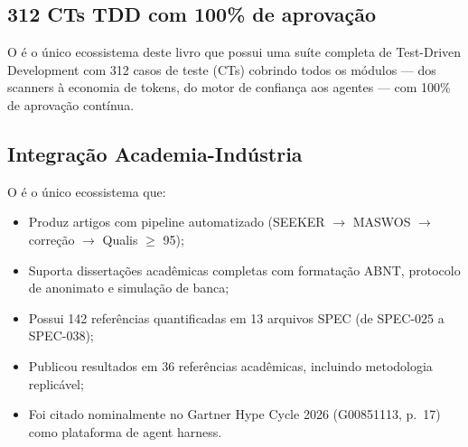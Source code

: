 \subsection{312 CTs TDD com 100\% de aprovação}

O \opencodeeco{} é o único ecossistema deste livro que possui uma suíte
completa de Test-Driven Development com 312 casos de teste (CTs)
cobrindo todos os módulos --- dos scanners à economia de tokens, do
motor de confiança aos agentes --- com 100\% de aprovação contínua.

\begin{table}[htb]
\centering
    \small
\caption{Cobertura de testes: OpenCode vs. alternativas}
\label{tab:testes}
\end{table}

\subsection{Integração Academia-Indústria}

O \opencodeeco{} é o único ecossistema que:
\begin{itemize}
    \item Produz artigos \qualisA{} com pipeline automatizado
          (SEEKER $\rightarrow$ MASWOS $\rightarrow$ correção
          $\rightarrow$ Qualis $\ge$ 95);
    \item Suporta dissertações acadêmicas completas com formatação
          ABNT, protocolo de anonimato e simulação de banca;
    \item Possui 142 referências quantificadas em 13 arquivos SPEC
          (de SPEC-025 a SPEC-038);
    \item Publicou resultados em 36 referências acadêmicas,
          incluindo metodologia replicável;
    \item Foi citado nominalmente no Gartner Hype Cycle 2026
          (G00851113, p.~17) como plataforma de agent harness.
\end{itemize}


